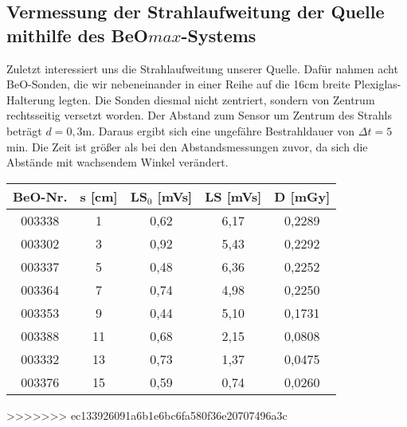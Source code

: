 \subsection{Vermessung der Strahlaufweitung der Quelle mithilfe des BeO$max$-Systems}

Zuletzt interessiert uns die Strahlaufweitung unserer Quelle. Dafür nahmen acht BeO-Sonden, die wir nebeneinander in einer Reihe auf die 16cm breite Plexiglas-Halterung legten. Die Sonden diesmal nicht zentriert, sondern von Zentrum rechtsseitig versetzt worden. Der Abstand zum Sensor um Zentrum des Strahls beträgt $d = 0,3$m. Daraus ergibt sich eine ungefähre Bestrahldauer von $\Delta t = 5$min. Die Zeit ist größer als bei den Abstandsmessungen zuvor, da sich die Abstände mit wachsendem Winkel verändert.

	\begin{center}
		\begin{tabular}{c|c|c|c|c}
				\textbf{BeO-Nr.}& \textbf{s} [cm] & \textbf{LS$_0$} [mVs] & \textbf{LS} [mVs] & \textbf{D} [mGy] \\
		 \hline 003338 &  1 & 0,62 & 6,17 & 0,2289 \\
				003302 &  3 & 0,92 & 5,43 & 0,2292 \\
				003337 &  5 & 0,48 & 6,36 & 0,2252 \\
				003364 &  7 & 0,74 & 4,98 & 0,2250 \\
				003353 &  9 & 0,44 & 5,10 & 0,1731 \\
				003388 & 11	& 0,68 & 2,15 & 0,0808 \\
				003332 & 13 & 0,73 & 1,37 & 0,0475 \\
				003376 & 15 & 0,59 & 0,74 & 0,0260 \\
		\end{tabular}
	\end{center} 
>>>>>>> ec133926091a6b1e6bc6fa580f36e20707496a3c
